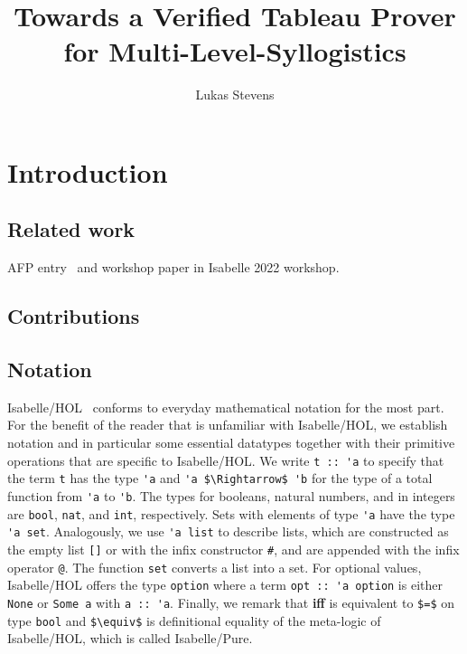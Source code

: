 \documentclass[sigplan,10pt,anonymous,review]{acmart}
\begin{document}
\setcounter{tocdepth}{1}

\title{Towards a Verified Tableau Prover for Multi-Level-Syllogistics}
\author{Lukas Stevens}

\begin{abstract}
\end{abstract}

\maketitle

\listoftodos{}

\section{Introduction}

\subsection{Related work}
AFP entry~\cite{hybrid_logic_afp} and workshop paper in Isabelle 2022 workshop.

\subsection{Contributions}

\subsection{Notation}
Isabelle/HOL~\cite{isabelle} conforms to everyday mathematical notation for the most part.
For the benefit of the reader that is unfamiliar with Isabelle/HOL, we establish notation and in particular some essential datatypes together with their primitive operations that are specific to Isabelle/HOL.
We write \lstinline!t :: 'a! to specify that the term \lstinline!t! has the type \lstinline!'a! and \lstinline!'a $\Rightarrow$ 'b! for the type of a total function from \lstinline!'a! to \lstinline!'b!.
The types for booleans, natural numbers, and in integers are \lstinline!bool!, \lstinline!nat!, and \lstinline!int!, respectively.
Sets with elements of type \lstinline!'a! have the type \lstinline!'a set!.
Analogously, we use \lstinline!'a list! to describe lists, which are constructed as the empty list \lstinline![]! or with the infix constructor \lstinline!#!, and are appended with the infix operator \lstinline!@!.
The function \lstinline!set! converts a list into a set.
For optional values, Isabelle/HOL offers the type \lstinline!option! where a term \lstinline!opt :: 'a option! is either \lstinline!None! or \lstinline!Some a! with \lstinline!a :: 'a!.
Finally, we remark that \textbf{iff} is equivalent to \lstinline!$=$! on type \lstinline!bool! and \lstinline!$\equiv$! is definitional equality of the meta-logic of Isabelle/HOL, which is called Isabelle/Pure.
\end{document}

